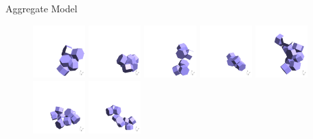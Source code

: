 \documentclass[12pt]{beamer}
\begin{document}
\begin{frame}{Aggregate Model}
\begin{figure}
    \centering
    \includegraphics[width = 0.18\textwidth]{Figures/aggregates/aggregate492.png}
    \includegraphics[width = 0.18\textwidth]{Figures/aggregates/aggregate547.png}
    \includegraphics[width = 0.18\textwidth]{Figures/aggregates/aggregate584.png}
    \includegraphics[width = 0.18\textwidth]{Figures/aggregates/aggregate621.png}
    \includegraphics[width = 0.18\textwidth]{Figures/aggregates/aggregate647.png}
    \hfill
    \includegraphics[width = 0.18\textwidth]{Figures/aggregates/aggregate697.png}
    \includegraphics[width = 0.18\textwidth]{Figures/aggregates/aggregate748.png}

\end{figure}
\end{frame}
\end{document}
